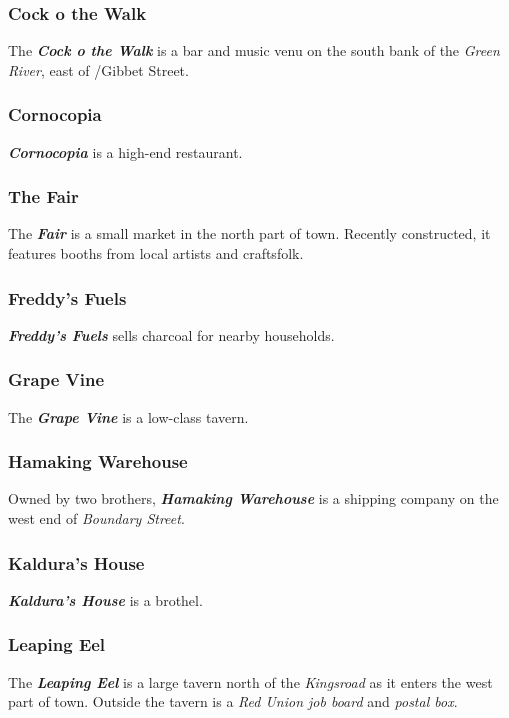 \documentclass[11pt]{teraum_adventure}
\begin{document}
\subsubsection*{Cock o the Walk}
\label{sec:org7c5ade1}
The \textbf{\emph{Cock o the Walk}} is a bar and music venu on the south bank of
the \emph{Green River}, east of /Gibbet Street.
\subsubsection*{Cornocopia}
\label{sec:org9e13bb2}
\textbf{\emph{Cornocopia}} is a high-end restaurant.
\subsubsection*{The Fair}
\label{sec:org758b0c1}
The \textbf{\emph{Fair}} is a small market in the north part of town. Recently
constructed, it features booths from local artists and craftsfolk.
\subsubsection*{Freddy's Fuels}
\label{sec:org7ba88eb}
\textbf{\emph{Freddy's Fuels}} sells charcoal for nearby households.
\subsubsection*{Grape Vine}
\label{sec:org9303cd8}
The \textbf{\emph{Grape Vine}} is a low-class tavern.
\subsubsection*{Hamaking Warehouse}
\label{sec:orgdb97110}
Owned by two brothers, \textbf{\emph{Hamaking Warehouse}} is a shipping company
on the west end of \emph{Boundary Street}.
\subsubsection*{Kaldura's House}
\label{sec:orgbbd8636}
\textbf{\emph{Kaldura's House}} is a brothel.
\subsubsection*{Leaping Eel}
\label{sec:org10f23b5}
The \textbf{\emph{Leaping Eel}} is a large tavern north of the \emph{Kingsroad} as it
enters the west part of town. Outside the tavern is a \emph{Red Union job
board} and \emph{postal box}.
\end{document}
